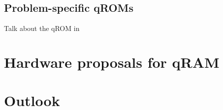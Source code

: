 \documentclass[a4paper,12pt]{article}
\begin{document}
\subsection{Problem-specific qROMs}

Talk about the qROM in \cite{Babbush2018}

\section{Hardware proposals for qRAM}
\label{sec:hardware}




\section{Outlook}
\label{sec:outlook}




\end{document}
